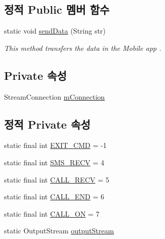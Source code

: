 \subsection*{정적 Public 멤버 함수}
\begin{DoxyCompactItemize}
\item 
static void \hyperlink{classkr_1_1ac_1_1kookmin_1_1cs_1_1bluetooth_1_1_process_connection_thread_afd3322fad0409741040de7c478210218}{send\+Data} (String str)
\begin{DoxyCompactList}\small\item\em This method transfers the data in the Mobile app . \end{DoxyCompactList}\end{DoxyCompactItemize}
\subsection*{Private 속성}
\begin{DoxyCompactItemize}
\item 
Stream\+Connection \hyperlink{classkr_1_1ac_1_1kookmin_1_1cs_1_1bluetooth_1_1_process_connection_thread_a3279e43af243928d3eafa90238198fc1}{m\+Connection}
\end{DoxyCompactItemize}
\subsection*{정적 Private 속성}
\begin{DoxyCompactItemize}
\item 
static final int \hyperlink{classkr_1_1ac_1_1kookmin_1_1cs_1_1bluetooth_1_1_process_connection_thread_a9b1ebd6964ca0131244012f911344bc7}{E\+X\+I\+T\+\_\+\+C\+M\+D} = -\/1
\item 
static final int \hyperlink{classkr_1_1ac_1_1kookmin_1_1cs_1_1bluetooth_1_1_process_connection_thread_ad4414914d0f4597985a7d5d9a393dbe8}{S\+M\+S\+\_\+\+R\+E\+C\+V} = 4
\item 
static final int \hyperlink{classkr_1_1ac_1_1kookmin_1_1cs_1_1bluetooth_1_1_process_connection_thread_a0548e2796fc397b9e2200ece09ddaf85}{C\+A\+L\+L\+\_\+\+R\+E\+C\+V} = 5
\item 
static final int \hyperlink{classkr_1_1ac_1_1kookmin_1_1cs_1_1bluetooth_1_1_process_connection_thread_aa6652de5543b447becf5038350c347db}{C\+A\+L\+L\+\_\+\+E\+N\+D} = 6
\item 
static final int \hyperlink{classkr_1_1ac_1_1kookmin_1_1cs_1_1bluetooth_1_1_process_connection_thread_ac05e580f8a5d910bb6803edd7680f6ce}{C\+A\+L\+L\+\_\+\+O\+N} = 7
\item 
static Output\+Stream \hyperlink{classkr_1_1ac_1_1kookmin_1_1cs_1_1bluetooth_1_1_process_connection_thread_ab283f9949cd2d643769616474eecba8c}{output\+Stream}
\end{DoxyCompactItemize}


